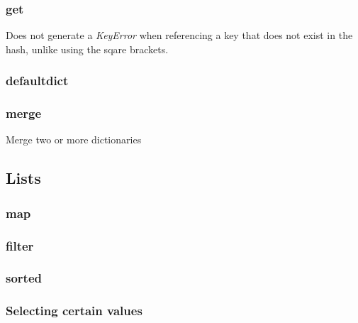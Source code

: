 \documentclass[12pt]{article}
\begin{document}
\subsubsection{get}

Does not generate a \emph{KeyError} when referencing a key that does not exist in the hash, unlike using the sqare brackets.




\subsubsection{defaultdict}




\subsubsection{merge}

Merge two or more dictionaries





\subsection{Lists}


\subsubsection{map}




\subsubsection{filter}






\subsubsection{sorted}




\subsubsection{Selecting certain values}
\end{document}
